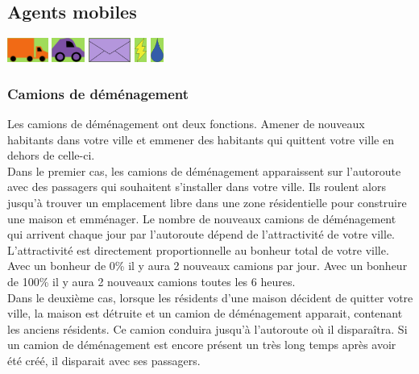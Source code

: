 \documentclass[11pt]{report}
\begin{document}
\newpage
\subsection{Agents mobiles}
\begin{center}
	\includegraphics[height=30px]{movingtruck}
	\hspace{1cm}
	\includegraphics[height=30px]{car}
	\hspace{1cm}
	\includegraphics[height=30px]{offer}
	\hspace{1cm}
	\includegraphics[height=30px]{electricity}
	\includegraphics[height=30px]{water}
\end{center}

\subsubsection{Camions de déménagement}
Les camions de déménagement ont deux fonctions. Amener de nouveaux habitants dans votre ville et emmener des habitants qui quittent votre ville en dehors de celle-ci.\\
Dans le premier cas, les camions de déménagement apparaissent sur l'autoroute avec des passagers qui souhaitent s'installer dans votre ville. Ils roulent alors jusqu'à trouver un emplacement libre dans une zone résidentielle pour construire une maison et emménager.
Le nombre de nouveaux camions de déménagement qui arrivent chaque jour par l'autoroute dépend de l’attractivité de votre ville. L'attractivité est directement proportionnelle au bonheur total de votre ville. Avec un bonheur de 0\% il y aura 2 nouveaux camions par jour. Avec un bonheur de 100\% il y aura 2 nouveaux camions toutes les 6 heures.\\
Dans le deuxième cas, lorsque les résidents d'une maison décident de quitter votre ville, la maison est détruite et un camion de déménagement apparait, contenant les anciens résidents. Ce camion conduira jusqu'à l'autoroute où il disparaîtra. Si un camion de déménagement est encore présent un très long temps après avoir été créé, il disparait avec ses passagers.
\end{document}
